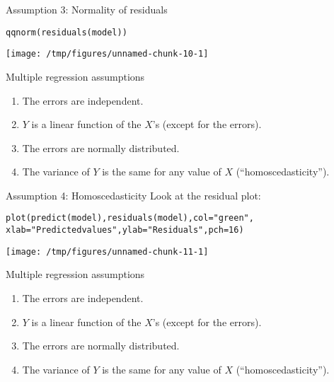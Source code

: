 \documentclass{beamer}\usepackage[]{graphicx}\usepackage[]{color}
\makeatletter
\def\maxwidth{ %
  \ifdim\Gin@nat@width>\linewidth
    \linewidth
  \else
    \Gin@nat@width
  \fi
}
\newcommand{\hlnum}[1]{\textcolor[rgb]{0.824,0.412,0.118}{#1}}%
\newcommand{\hlstr}[1]{\textcolor[rgb]{1,0.894,0.71}{#1}}%
\newcommand{\hlstd}[1]{\textcolor[rgb]{1,0.894,0.769}{#1}}%
\newcommand{\hlkwc}[1]{\textcolor[rgb]{0.78,0.941,0.545}{#1}}%
\newcommand{\hlkwd}[1]{\textcolor[rgb]{1,0.78,0.769}{#1}}%
\newenvironment{kframe}{%
 \def\at@end@of@kframe{}%
 \ifinner\ifhmode%
  \def\at@end@of@kframe{\end{minipage}}%
  \begin{minipage}{\columnwidth}%
 \fi\fi%
 \def\FrameCommand##1{\hskip\@totalleftmargin \hskip-\fboxsep
 \colorbox{shadecolor}{##1}\hskip-\fboxsep
     \hskip-\linewidth \hskip-\@totalleftmargin \hskip\columnwidth}%
 \MakeFramed {\advance\hsize-\width
   \@totalleftmargin\z@ \linewidth\hsize
   \@setminipage}}%
 {\par\unskip\endMakeFramed%
 \at@end@of@kframe}
\newenvironment{knitrout}{}{} %
\makeatother
\begin{document}
\begin{darkframes}
    \begin{frame}[fragile]{Assumption 3: Normality of residuals}
\begin{knitrout}
\color{fgcolor}\begin{kframe}
\begin{alltt}
\hlkwd{qqnorm}\hlstd{(}\hlkwd{residuals}\hlstd{(model))}
\end{alltt}
\end{kframe}
\texttt{[image: /tmp/figures/unnamed-chunk-10-1]} 

\end{knitrout}
    \end{frame}

    \begin{frame}{Multiple regression assumptions}
      \begin{enumerate}
        \item The errors are independent. \greencheckmark
        \item $Y$ is a linear function of the $X$'s (except for the errors). \greencheckmark
        \item The errors are normally distributed. \greencheckmark
        \item The variance of $Y$ is the same for any value of $X$ (``homoscedasticity'').
      \end{enumerate}
    \end{frame}

    \begin{frame}[fragile]{Assumption 4: Homoscedasticity}
      Look at the residual plot:
\begin{knitrout}
\color{fgcolor}\begin{kframe}
\begin{alltt}
\hlkwd{plot}\hlstd{(}\hlkwd{predict}\hlstd{(model),} \hlkwd{residuals}\hlstd{(model),} \hlkwc{col}\hlstd{=}\hlstr{"green"}\hlstd{,}
  \hlkwc{xlab}\hlstd{=}\hlstr{"Predicted values"}\hlstd{,} \hlkwc{ylab}\hlstd{=}\hlstr{"Residuals"}\hlstd{,} \hlkwc{pch}\hlstd{=}\hlnum{16}\hlstd{)}
\end{alltt}
\end{kframe}
\texttt{[image: /tmp/figures/unnamed-chunk-11-1]} 

\end{knitrout}
    \end{frame}

    \begin{frame}{Multiple regression assumptions}
      \begin{enumerate}
        \item The errors are independent. \greencheckmark
        \item $Y$ is a linear function of the $X$'s (except for the errors). \greencheckmark
        \item The errors are normally distributed. \greencheckmark
        \item The variance of $Y$ is the same for any value of $X$ (``homoscedasticity''). \shrug[red]
      \end{enumerate}
    \end{frame}


\end{darkframes}
\end{document}

